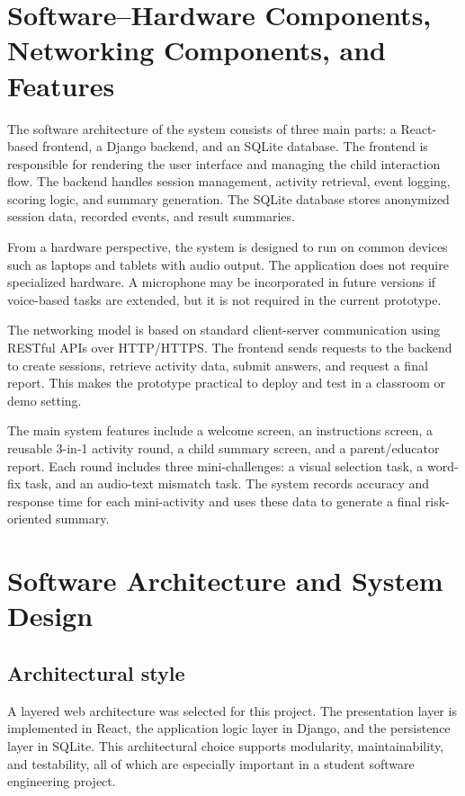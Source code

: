 \documentclass[conference]{IEEEtran}
\begin{document}
\section{Software--Hardware Components, Networking Components, and Features}

The software architecture of the system consists of three main parts: a React-based frontend, a Django backend, and an SQLite database. The frontend is responsible for rendering the user interface and managing the child interaction flow. The backend handles session management, activity retrieval, event logging, scoring logic, and summary generation. The SQLite database stores anonymized session data, recorded events, and result summaries.

From a hardware perspective, the system is designed to run on common devices such as laptops and tablets with audio output. The application does not require specialized hardware. A microphone may be incorporated in future versions if voice-based tasks are extended, but it is not required in the current prototype.

The networking model is based on standard client-server communication using RESTful APIs over HTTP/HTTPS. The frontend sends requests to the backend to create sessions, retrieve activity data, submit answers, and request a final report. This makes the prototype practical to deploy and test in a classroom or demo setting.

The main system features include a welcome screen, an instructions screen, a reusable 3-in-1 activity round, a child summary screen, and a parent/educator report. Each round includes three mini-challenges: a visual selection task, a word-fix task, and an audio-text mismatch task. The system records accuracy and response time for each mini-activity and uses these data to generate a final risk-oriented summary.

\section{Software Architecture and System Design}

\subsection{Architectural style}

A layered web architecture was selected for this project. The presentation layer is implemented in React, the application logic layer in Django, and the persistence layer in SQLite. This architectural choice supports modularity, maintainability, and testability, all of which are especially important in a student software engineering project.
\end{document}
